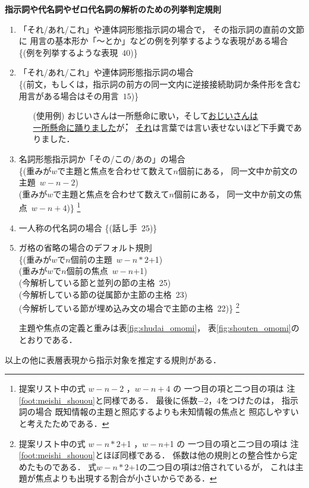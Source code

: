 {
{\bf 指示詞や代名詞やゼロ代名詞の解析のための列挙判定規則}
\begin{enumerate}
\item 「それ/あれ/これ」や連体詞形態指示詞の場合で，
  その指示詞の直前の文節に
  用言の基本形か「〜とか」などの例を列挙するような表現がある場合\\ 
  \{(例を列挙するような表現 \,$40$)\}
\item 「それ/あれ/これ」や連体詞形態指示詞の場合\\ 
  \{(前文，もしくは，指示詞の前方の同一文内に逆接接続助詞か条件形を含む
  用言がある場合はその用言 \,$15$)\}

  \begin{itemize}
  \item[(使用例)]
    おじいさんは一所懸命に歌い，そして\underline{おじいさんは}\\
    \underline{一所懸命に踊りました}\.が，
    \underline{それ}は言葉では言い表せないほど下手糞でありました．
  \end{itemize}

\item 名詞形態指示詞か「その/この/あの」の場合\\ 
  \{(重みが$w$で主題と焦点を合わせて数えて$n$個前にある，
  同一文中か前文の主題 \,$w-n-2$)\\ 
  (重みが$w$で主題と焦点を合わせて数えて$n$個前にある，
  同一文中か前文の焦点 \,$w-n+4$)\}
  \footnote{
  提案リスト中の式 $w-n-2$ ，$w-n+4$ の
  一つ目の項と二つ目の項は
  注\ref{foot:meishi_shouou}と同様である．
  最後に係数$-2$，$4$をつけたのは，
  指示詞の場合
  既知情報の主題と照応するよりも未知情報の焦点と
  照応しやすいと考えたためである．
}

\item 一人称の代名詞の場合 \{(話し手 \,$25$)\}

\item ガ格の省略の場合のデフォルト規則\\
  \{(重みが$w$で$n$個前の主題 \,$w-n*2$+1)\\
  (重みが$w$で$n$個前の焦点 \,$w-n$+1)\\
  (今解析している節と並列の節の主格 \,25)\\
  (今解析している節の従属節か主節の主格 \,23)\\
  (今解析している節が埋め込み文の場合で主節の主格 \,22)\}
  \footnote{
  提案リスト中の式 $w-n*2$+1 ，$w-n$+1 の
  一つ目の項と二つ目の項は
  注\ref{foot:meishi_shouou}とほぼ同様である．
  係数は他の規則との整合性から定めたものである．
  式$w-n*2$+1の二つ目の項は2倍されているが，
  これは主題が焦点よりも出現する割合が小さいからである．
}

  主題や焦点の定義と重みは表\ref{fig:shudai_omomi}，
  表\ref{fig:shouten_omomi}のとおりである．

\end{enumerate}

以上の他に表層表現から指示対象を推定する規則がある．
}

